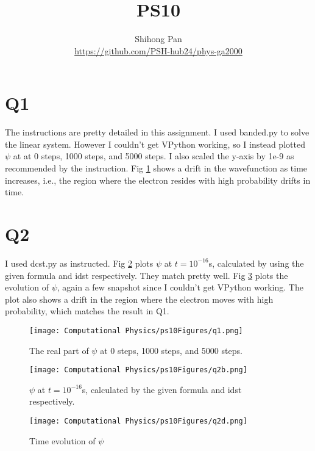 \documentclass[11pt]{article}
\title{PS10}
\author{Shihong Pan\\ \url{https://github.com/PSH-hub24/phys-ga2000}}
\begin{document}
\maketitle

\section*{Q1}
The instructions are pretty detailed in this assignment. I used banded.py to solve the linear system. However I couldn't get VPython working, so I instead plotted $\psi$ at at 0 steps, 1000 steps, and 5000 steps. I also scaled the y-axis by 1e-9 as recommended by the instruction. Fig \ref{fig:Q1} shows a drift in the wavefunction as time increases, i.e., the region where the electron resides with high probability drifts in time. 

\section*{Q2}
I used dcst.py as instructed. Fig \ref{fig:Q2b} plots $\psi$ at  $t=10^{-16}$s, calculated by using the given formula and idst respectively. They match pretty well. Fig \ref{fig:Q2cd} plots the evolution of $\psi$, again a few snapshot since I couldn't get VPython working. The plot also shows a drift in the region where the electron moves with high probability, which matches the result in Q1.

\begin{figure}[b!]
\centering
\texttt{[image: Computational Physics/ps10Figures/q1.png]}
\caption{The real part of $\psi$ at 0 steps, 1000 steps, and 5000 steps.}
  \label{fig:Q1}
\end{figure}

\begin{figure}[b!]
\centering
\texttt{[image: Computational Physics/ps10Figures/q2b.png]}
\caption{$\psi$ at $t=10^{-16}$s, calculated by the given formula and idst respectively.}
  \label{fig:Q2b}
\end{figure}

\begin{figure}[b!]
\centering
\texttt{[image: Computational Physics/ps10Figures/q2d.png]}
\caption{Time evolution of $\psi$}
  \label{fig:Q2cd}
\end{figure}







\end{document}
